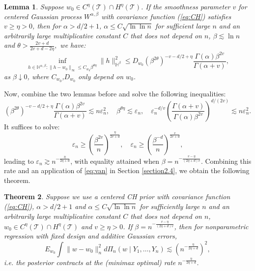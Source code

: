 \documentclass[ejs,noshowframe]{imsart}
\theoremstyle{plain}
\newtheorem{theorem}{Theorem}[section]
\newtheorem{lemma}[theorem]{Lemma}
\theoremstyle{definition}
\theoremstyle{remark}
\begin{document}
\begin{lemma}\label{CH decentering}
Suppose $w_0 \in C^{\eta}(\mathcal{T}) \cap H^{\eta}(\mathcal{T})$. If the smoothness parameter $v$ for centered Gaussian process $W^{\alpha,\beta}$  with  covariance function  (\ref{eq:CH}) satisfies  $ v \ge \eta >0$,  then  for  $\alpha>d/2+1$, $\alpha \leq C \sqrt{\ln \ln{n}}$  for sufficient large $n$ and an arbitrarily large multiplicative constant $C$ that  does not depend on $n$, $\beta \lesssim \ln n$ and $\theta > \frac{2v+d}{2v+d-2 \eta},$ we have: 
$$
\inf_{h \in \mathbb{H}^{\alpha,\beta}:\|h-w_0\|_{\infty}\le C_{w_0} \beta^{\theta \eta}}\|h\|_{\mathbb{H}^{\beta}}^2 \le D_{w_0}(\beta^{2\theta})^{-v-d/2+\eta} \frac{\Gamma(\alpha) \beta^{2v}}{\Gamma(\alpha+v)},
$$
as $\beta \downarrow 0$, where $C_{w_0}$,$D_{w_0}$ only depend on $w_0$.
\end{lemma}
Now, combine the two lemmas before and  solve the following inequalities:
\begin{displaymath}
    (\beta^{2\theta})^{-v-d/2+\eta} \frac{\Gamma(\alpha) \beta^{2v}}{\Gamma(\alpha+v)} \lesssim  n \varepsilon_n^2, \quad \beta^{\theta \eta} \lesssim \varepsilon_n,\quad  \varepsilon_n^{-d/v} \left(\frac{\Gamma(\alpha+v)}{\Gamma(\alpha) \beta^{2v}}\right)^{d/(2v)} \lesssim n \varepsilon_n^2.
\end{displaymath}
It suffices to solve:
\begin{displaymath}
   \varepsilon_n \ge \left( \frac{\beta^{2v}}{n}\right)^{\frac{\eta}{2v+d}}, \quad
   \varepsilon_n \ge \left( \frac{\beta^{-d}}{n}\right)^{\frac{v}{2v+d}}, 
\end{displaymath}
leading to  $\varepsilon_n \gtrsim n^{-\frac{\eta}{2\eta+d}}$, with equality attained when $\beta=n^{-\frac{v-\eta}{(2\eta+d)v}}$. Combining this rate and an application of \eqref{eq:van} in Section  \ref{section2.4}, we obtain the following theorem.
\begin{theorem}
Suppose we use a centered CH prior with  covariance function  (\ref{eq:CH}), $\alpha>d/2+1$ and $\alpha \leq C \sqrt{\ln \ln{n}}$  for sufficiently large $n$ and an arbitrarily large multiplicative constant $C$ that  does not depend on $n$, $w_0 \in C^{\eta}(\mathcal{T}) \cap H^{\eta}(\mathcal{T})$ and $v \ge \eta>0$.  If $\beta=n^{-\frac{v-\eta}{(2\eta+d)v}}$,  then  for nonparametric regression with fixed design and additive Gaussian errors,
$$
E_{w_0} \int \|w-w_0\|_n^2 d \Pi_n(w\mid Y_1,\ldots,Y_n) \lesssim (n^{-\frac{\eta}{2\eta+d}})^2,
$$
i.e. the posterior contracts at the (minimax optimal) rate $n^{-\frac{\eta}{2\eta+d}}$.
\label{rescale CH theorem}
\end{theorem}
\end{document}
